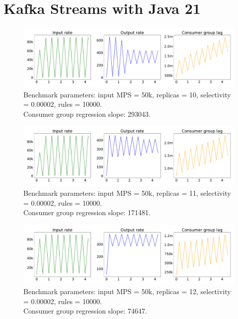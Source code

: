 \newpage

\section{Kafka Streams with Java 21}\label{sec:kafka-streams-on-java-21}

\begin{figure}[H]
    \centering
    \includegraphics[width=1\textwidth]{figures/k-streams-java-21-replicas-10}
    \caption{Benchmark parameters: input MPS = 50k, replicas = 10, selectivity = 0.00002, rules = 10000. \\
    Consumer group regression slope: 293043.}
    \label{fig:k-streams-java-21-replicas-10}
\end{figure}


\begin{figure}[H]
    \centering
    \includegraphics[width=1\textwidth]{figures/k-streams-java-21-replicas-11}
    \caption{Benchmark parameters: input MPS = 50k, replicas = 11, selectivity = 0.00002, rules = 10000. \\
    Consumer group regression slope: 171481.}
    \label{fig:k-streams-java-21-replicas-11}
\end{figure}

\begin{figure}[H]
    \centering
    \includegraphics[width=1\textwidth]{figures/k-streams-java-21-replicas-12}
    \caption{Benchmark parameters: input MPS = 50k, replicas = 12, selectivity = 0.00002, rules = 10000. \\
    Consumer group regression slope: 74647.}
    \label{fig:k-streams-java-21-replicas-12}
\end{figure}


